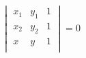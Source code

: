 \documentclass[12pt]{article}
\begin{document}
\[
    \begin{vmatrix}
        x_1 & y_1 & 1 \\
        x_2 & y_2 & 1 \\
        x & y & 1 \\
    \end{vmatrix} = 0
\]
\end{document}
